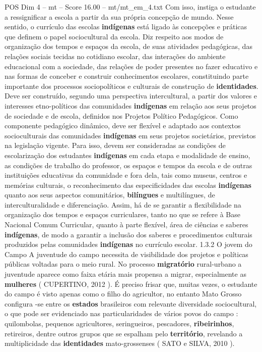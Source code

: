 \begin{textsample}{POS Dim 4 – mt – Score 16.00 – mt/mt\_em\_4.txt}
Com isso, instiga o estudante a ressignificar a escola a partir da sua própria concepção de mundo.
Nesse sentido, o currículo das escolas \textbf{indígenas} está ligado às concepções e práticas que definem o papel sociocultural da escola.
Diz respeito aos modos de organização dos tempos e espaços da escola, de suas atividades pedagógicas, das relações sociais tecidas no cotidiano escolar, das interações do ambiente educacional com a sociedade, das relações de poder presentes no fazer educativo e nas formas de conceber e construir conhecimentos escolares, constituindo parte importante dos processos sociopolíticos e culturais de construção de \textbf{identidades}.
Deve ser construído, segundo uma perspectiva intercultural, a partir dos valores e interesses etno-políticos das comunidades \textbf{indígenas} em relação aos seus projetos de sociedade e de escola, definidos nos Projetos Político Pedagógicos.
Como componente pedagógico dinâmico, deve ser flexível e adaptado aos contextos socioculturais das comunidades \textbf{indígenas} em seus projetos societários, previstos na legislação vigente.
Para isso, devem ser consideradas as condições de escolarização dos estudantes \textbf{indígenas} em cada etapa e modalidade de ensino, as condições de trabalho do professor, os espaços e tempos da escola e de outras instituições educativas da comunidade e fora dela, tais como museus, centros e memórias culturais, o reconhecimento das especificidades das escolas \textbf{indígenas} quanto aos seus aspectos comunitários, \textbf{bilíngues} e multilíngues, de interculturalidade e diferenciação.
Assim, há de se garantir a flexibilidade na organização dos tempos e espaços curriculares, tanto no que se refere à Base Nacional Comum Curricular, quanto à parte flexível, área de ciências e saberes \textbf{indígenas}, de modo a garantir a inclusão dos saberes e procedimentos culturais produzidos pelas comunidades \textbf{indígenas} no currículo escolar. 1.3.2 O jovem do Campo A juventude do campo necessita de visibilidade dos projetos e políticas públicas voltadas para o meio rural.
No processo \textbf{migratório} rural-urbano a juventude aparece como faixa etária mais propensa a migrar, especialmente as \textbf{mulheres} ( CUPERTINO, 2012 ).
É preciso frisar que, muitas vezes, o estudante do campo é visto apenas como o filho do agricultor, no entanto Mato Grosso configura -se entre os \textbf{estados} brasileiros com relevante diversidade sociocultural, o que pode ser evidenciado nas particularidades de vários povos do campo : quilombolas, pequenos agricultores, seringueiros, pescadores, \textbf{ribeirinhos}, retireiros, dentre outros grupos que se espalham pelo \textbf{território}, revelando a multiplicidade das \textbf{identidades} mato-grossenses ( SATO e SILVA, 2010 ).

\end{textsample}
